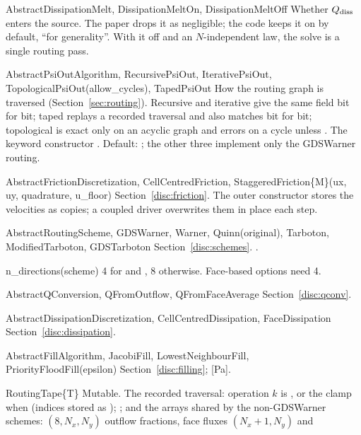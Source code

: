 \begin{fnlist}
\item[AbstractDissipationMelt, DissipationMeltOn, DissipationMeltOff] Whether $Q_{\rm diss}$ enters the source. The paper drops it as
  negligible; the code keeps it on by default, ``for generality''. With it off and an $N$-independent law, the solve is a single
  routing pass.
\item[AbstractPsiOutAlgorithm, RecursivePsiOut, IterativePsiOut, TopologicalPsiOut(allow\_cycles), TapedPsiOut] How the routing graph is
  traversed (Section~\ref{sec:routing}). Recursive and iterative give the same field bit for bit; taped replays a recorded traversal
  and also matches bit for bit; topological is exact only on an acyclic graph and errors on a cycle unless .
  The keyword constructor . Default: ; the other three implement
  only the GDSWarner routing.
\item[AbstractFrictionDiscretization, CellCentredFriction, StaggeredFriction\{M\}(ux, uy, quadrature, u\_floor)] Section~\ref{disc:friction}. The
  outer constructor  stores the velocities as
   copies; a coupled driver overwrites them in place each step.
\item[AbstractRoutingScheme, GDSWarner, Warner, Quinn(original), Tarboton, ModifiedTarboton, GDSTarboton] Section~\ref{disc:schemes}.
  .
\item[n\_directions(scheme)] 4 for  and , 8 otherwise. Face-based options need 4.
\item[AbstractQConversion, QFromOutflow, QFromFaceAverage] Section~\ref{disc:qconv}.
\item[AbstractDissipationDiscretization, CellCentredDissipation, FaceDissipation] Section~\ref{disc:dissipation}.
\item[AbstractFillAlgorithm, JacobiFill, LowestNeighbourFill, PriorityFloodFill(epsilon)] Section~\ref{disc:filling};
   [Pa].
\item[RoutingTape\{T\}] Mutable. The recorded traversal: operation $k$ is , or the clamp
   when  (indices stored as ); ; and the arrays shared
  by the non-GDSWarner schemes:  $(8, N_x, N_y)$ outflow fractions, face fluxes  $(N_x{+}1, N_y)$ and 

\end{fnlist}
